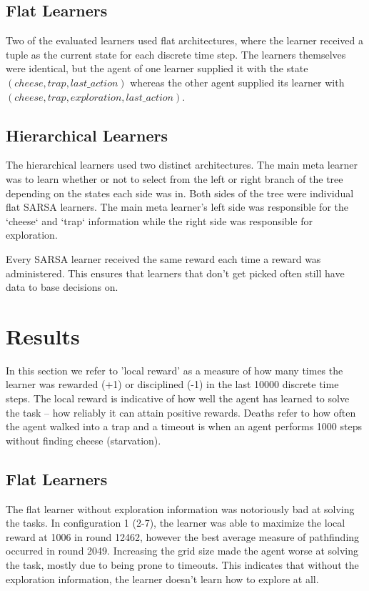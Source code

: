 \documentclass{article}
\begin{document}
	\subsection{Flat Learners}
	\label{s:met:flat}
	Two of the evaluated learners used flat architectures, where the learner received a tuple as the current state for each discrete time step. The learners themselves were identical, but the agent of one learner supplied it with the state $(cheese, trap, last\_action)$ whereas the other agent supplied its learner with $(cheese, trap, exploration, last\_action)$. 

	\subsection{Hierarchical Learners}
	\label{s:met:meta}
	The hierarchical learners used two distinct architectures. The main meta learner was to learn whether or not to select from the left or right branch of the tree depending on the states each side was in. Both sides of the tree were individual flat SARSA learners.
	The main meta learner's left side was responsible for the `cheese` and `trap` information while the right side was responsible for exploration. 

	Every SARSA learner received the same reward each time a reward was administered. This ensures that learners that don't get picked often still have data to base decisions on.

	\section{Results}
	\label{sec:results}
	In this section we refer to 'local reward' as a measure of how many times the learner was rewarded (+1) or disciplined (-1) in the last 10000 discrete time steps. The local reward is indicative of how well the agent has learned to solve the task -- how reliably it can attain positive rewards.
	Deaths refer to how often the agent walked into a trap and a timeout is when an agent performs 1000 steps without finding cheese (starvation).

	\subsection{Flat Learners}
	\label{s:res:flat}
	The flat learner without exploration information was notoriously bad at solving the tasks. In configuration 1 (2-7), the learner was able to maximize the local reward at 1006 in round 12462, however the best average measure of pathfinding occurred in round 2049. Increasing the grid size made the agent worse at solving the task, mostly due to being prone to timeouts. This indicates that without the exploration information, the learner doesn't learn how to explore at all. 
\end{document}
